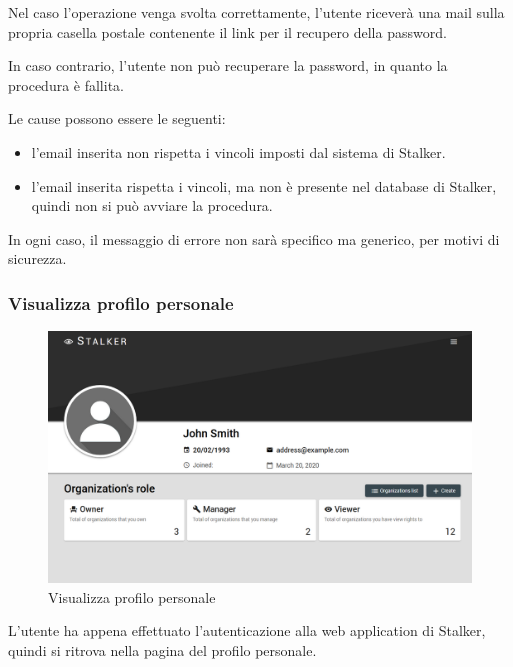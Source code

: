 \documentclass[../manuale-utente.tex]{subfiles}
\begin{document}
Nel caso l'operazione venga svolta correttamente, l'utente riceverà una mail sulla propria casella postale contenente il link per il recupero della password.

In caso contrario, l'utente non può recuperare la password, in quanto la procedura è fallita.

Le cause possono essere le seguenti:
\begin{itemize}
    \item l'email inserita non rispetta i vincoli imposti dal sistema di Stalker.
    \item l'email inserita rispetta i vincoli, ma non è presente nel database di Stalker, quindi non si può avviare la procedura.
\end{itemize}

In ogni caso, il messaggio di errore non sarà specifico ma generico, per motivi di sicurezza.
\newpage

\subsubsection{Visualizza profilo personale}%
\label{subs:visualizza_profilo_personale}

\begin{figure}[H]
    \centering
    \includegraphics[width=120mm]{img/web-app/visualizza-profilo-personale.png}
    \caption{Visualizza profilo personale}%
    \label{fig:web_app_visualizza_profilo_personale}
\end{figure}

L'utente ha appena effettuato l'autenticazione alla web application di Stalker, quindi si ritrova nella pagina del profilo personale.
\end{document}
